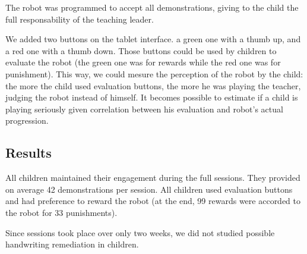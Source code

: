 \documentclass{sig-alternate}
\begin{document}
The robot was programmed to accept all demonstrations, giving to the child the
full responsability of the teaching leader.

We added two buttons on the tablet  interface. a green one with a thumb up, and
a red one with a thumb down. Those buttons could be used by children to evaluate the
robot (the green one was for rewards while the red one was for punishment). This
way, we could mesure the perception of the robot by the child: the more the
child used evaluation buttons, the more he was playing the teacher, judging the
robot instead of himself. It becomes possible to estimate if a child is playing
seriously given correlation between his evaluation and robot's actual
progression.


\subsection{Results}

All children maintained their engagement during the full sessions. They provided
on average 42 demonstrations per session. All children used evaluation buttons and
had preference to reward the robot (at the end, 99 rewards were accorded to the
robot for 33 punishments). 

Since sessions took place over only two weeks, we did not studied possible
handwriting remediation in children. 
\end{document}
